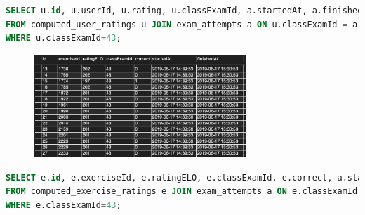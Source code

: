 \documentclass{IEEEtran}
\begin{document}
\begin{lstlisting}[language=SQL]
SELECT u.id, u.userId, u.rating, u.classExamId, a.startedAt, a.finishedAt 
FROM computed_user_ratings u JOIN exam_attempts a ON u.classExamId = a.classExamId 
WHERE u.classExamId=43;
\end{lstlisting}

\begin{figure}[h!]
    \includegraphics[width=8cm]{PrimerTabele}
    \label{fig:example}%
\end{figure}
\begin{lstlisting}[language=SQL]
SELECT e.id, e.exerciseId, e.ratingELO, e.classExamId, e.correct, a.startedAt, a.finishedAt 
FROM computed_exercise_ratings e JOIN exam_attempts a ON e.classExamId = a.classExamId 
WHERE e.classExamId=43;
\end{lstlisting}
\end{document}
